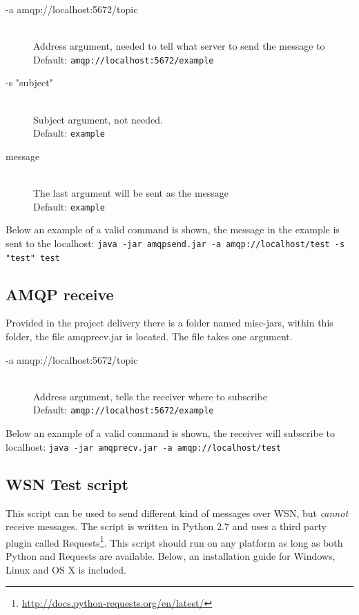 \begin{description}
    \item[-a amqp://localhost:5672/topic] \hfill \\
  Address argument, needed to tell what server to send the message to \hfill \\ Default: \verb!amqp://localhost:5672/example!
    \item[-s "subject"] \hfill \\
  Subject argument, not needed. \hfill \\ Default: \verb!example!
    \item[message] \hfill \\
  The last argument will be sent as the message \hfill \\ Default: \verb!example!
\end{description}
Below an example of a valid command is shown, the message in the example is sent to the localhost:
\verb!java -jar amqpsend.jar -a amqp://localhost/test -s "test" test!

\subsection{AMQP receive}
\label{subsec:test_clients-amqp_receive}
Provided in the project delivery there is a folder named misc-jars, within this folder, the file amqprecv.jar is located. The file takes one argument.
 
\begin{description}
    \item[-a amqp://localhost:5672/topic] \hfill \\
  Address argument, tells the receiver where to subscribe \hfill \\ Default: \verb!amqp://localhost:5672/example!
\end{description}
Below an example of a valid command is shown, the receiver will subscribe to localhost:
\verb!java -jar amqprecv.jar -a amqp://localhost/test!

\subsection{WSN Test script}
This script can be used to send different kind of messages over WSN, but \textit{cannot} receive messages. The script is written in Python 2.7 and uses a third party plugin called Requests\footnote{\url{http://docs.python-requests.org/en/latest/}}. This script should run on any platform as long as both Python and Requests are available. Below, an installation guide for Windows, Linux and OS X is included.

